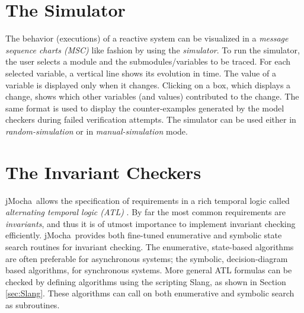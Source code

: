 \documentclass[10pt,twocolumn]{article}
\def\jmocha{{\small\sc jMocha}}
\def\slang{{\small\sc Slang}}
\begin{document}
\section{The Simulator}
\label{sec:The Simulator}

The behavior (executions) of a reactive system can be visualized in a
\emph{message sequence charts (MSC)} like fashion by using the
\emph{simulator}. 
To run the simulator, the user selects a module
and the submodules/variables to be traced. 
For each selected variable, 
a vertical line shows its evolution in time. 
The value of a variable is displayed only when it 
changes. Clicking on a box, which displays a change, shows which other
variables (and values) contributed to the change.
The same format is used to display the counter-examples generated
by the model checkers during failed verification attempts.
%
%
The simulator can be used either in \emph{random-simulation} 
   or in \emph{manual-simulation} mode.


\section{The Invariant Checkers}
\label{sec:The Checkers}

\jmocha\ allows the specification of requirements in a rich temporal logic 
called \emph{alternating temporal logic (ATL)} \cite{ATL}. 
By far the most common requirements are \emph{invariants}, and thus it is of 
utmost importance to implement invariant checking efficiently.
\jmocha\ provides both fine-tuned enumerative and symbolic 
state search routines for invariant checking.
The enumerative, state-based algorithms are often preferable for asynchronous
systems;
the symbolic, decision-diagram based algorithms, for synchronous systems.
More general ATL formulas can be checked by defining algorithms using the 
scripting \slang, as shown in Section \ref{sec:Slang}.
These algorithms can call on both enumerative and symbolic search as
subroutines.
\end{document}
